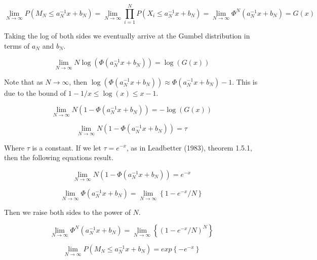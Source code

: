 \documentclass[paper=a4, fontsize=11pt]{article} %
\begin{document}
\begin{equation}
\label{eq:converge}
\lim_{N\rightarrow\infty}P\left(M_N\le a_N^{-1} x + b_N\right) = \lim_{N\rightarrow\infty}\prod_{i=1}^N P\left(X_i \le a_N^{-1} x + b_N\right) = \lim_{N\rightarrow\infty}\Phi^N\left(a_N^{-1} x + b_N\right) = G(x)
\end{equation}

Taking the log of both sides we eventually arrive at the Gumbel distribution in terms of \(a_N\) and \(b_N\).

\begin{equation}
\lim_{N\rightarrow\infty} N \log\left(\Phi(a_N^{-1} x + b_N)\right) = \log(G(x))
\end{equation}

Note that as \(N\rightarrow\infty\), then \(\log\left(\Phi(a_N^{-1} x + b_N)\right) \approx \Phi(a_N^{-1} x + b_N)-1\). This is due to the bound of \(1-1/x \le \log(x) \le x-1\).

\begin{equation}
\lim_{N\rightarrow\infty} N(1-\Phi(a_N^{-1} x + b_N)) = -\log(G(x))
\end{equation}

\begin{equation}
\lim_{N\rightarrow\infty} N(1-\Phi(a_N^{-1} x + b_N)) = \tau
\end{equation}

Where \(\tau\) is a constant. If we let \(\tau = e^{-x}\), as in Leadbetter (1983), theorem 1.5.1, then the following equations result.

\begin{equation}
\label{eq:gumbelbegin}
\lim_{N\rightarrow\infty}N(1-\Phi(a_N^{-1} x + b_N)) = e^{-x}
\end{equation}

\begin{equation}
\lim_{N\rightarrow\infty}\Phi(a_N^{-1} x + b_N) = \lim_{N\rightarrow\infty}\left\{1 - e^{-x}/N\right\}
\end{equation}

Then we raise both sides to the power of \(N\).

\begin{equation}
\lim_{N\rightarrow\infty}\Phi^N(a_N^{-1} x + b_N) = \lim_{N\rightarrow\infty}\left\{(1 - e^{-x}/N)^N\right\}
\end{equation}

\begin{equation}
\label{eq:stdgumbel}
\lim_{N\rightarrow\infty}P(M_N \le a_N^{-1} x + b_N) = exp\left\{-e^{-x}\right\}
\end{equation}
\end{document}
